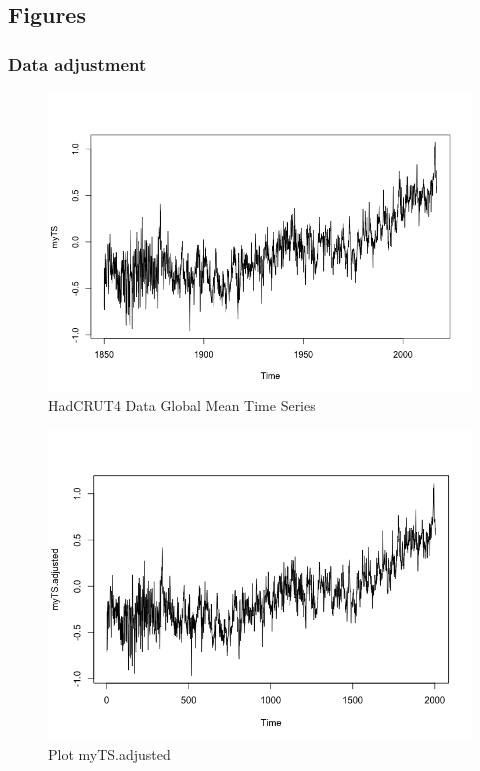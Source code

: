 \documentclass[a4paper,10pt]{article}
\begin{document}
\subsection{Figures}

\subsubsection{Data adjustment}

\begin{figure}[H]
\centering
\caption{HadCRUT4 Data Global Mean Time Series}
\includegraphics[scale=.5]{temp.png}
\end{figure}

\begin{figure}[H]
\centering
\caption{Plot myTS.adjusted}
\includegraphics[scale=.5]{myTSadjusted.png}
\end{figure}
\end{document}
